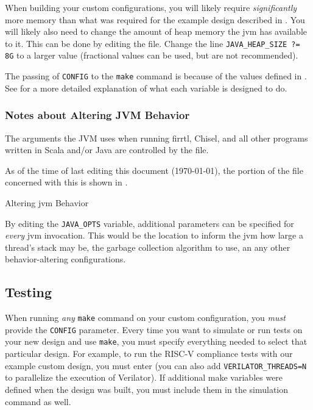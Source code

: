 \begin{blackbox}
  When building your custom configurations, you will likely require \emph{significantly} more memory than what was required for the example design described in .
  You will likely also need to change the amount of heap memory the \gls{jvm} has available to it.
  This can be done by editing the  file.
  Change the line \texttt{JAVA_HEAP_SIZE ?= 8G} to a larger value (fractional values can be used, but are not recommended).
\end{blackbox}

The passing of \texttt{CONFIG} to the \texttt{make} command is because of the values defined in .
See  for a more detailed explanation of what each variable is designed to do.

\subsubsection{Notes about Altering JVM Behavior}\label{sec:Notes_Altering_JVM_Behavior}
The arguments the JVM uses when running \gls{firrtl}, Chisel, and all other programs written in Scala and/or Java are controlled by the  file.

As of the time of last editing this document (\today), the portion of the file concerned with this is shown in .

\begin{listing}[h!tbp]
\caption{Altering \Gls{jvm} Behavior}
\label{lst:Altering_JVM_Behavior}
\end{listing}

By editing the \texttt{JAVA_OPTS} variable, additional parameters can be specified for \emph{every} \Gls{jvm} invocation.
This would be the location to inform the \Gls{jvm} how large a thread's stack may be, the garbage collection algorithm to use, an any other behavior-altering configurations.

\subsection{Testing}\label{sec:Custom_Config-Testing}
When running \emph{any} \texttt{make} command on your custom configuration, you \emph{must} provide the \texttt{CONFIG} parameter.
Every time you want to simulate or run tests on your new design and use \texttt{make}, you must specify everything needed to select that particular design.
For example, to run the RISC-V compliance tests with our example custom design, you must enter  (you can also add \texttt{VERILATOR_THREADS=N} to parallelize the execution of Verilator).
If additional make variables were defined when the design was built, you must include them in the simulation command as well.

